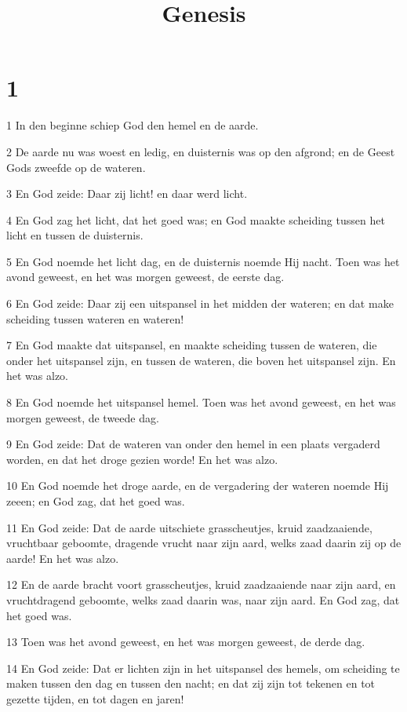 

\title{Genesis}




\chapter{1}

\par 1 In den beginne schiep God den hemel en de aarde.
\par 2 De aarde nu was woest en ledig, en duisternis was op den afgrond; en de Geest Gods zweefde op de wateren.
\par 3 En God zeide: Daar zij licht! en daar werd licht.
\par 4 En God zag het licht, dat het goed was; en God maakte scheiding tussen het licht en tussen de duisternis.
\par 5 En God noemde het licht dag, en de duisternis noemde Hij nacht. Toen was het avond geweest, en het was morgen geweest, de eerste dag.
\par 6 En God zeide: Daar zij een uitspansel in het midden der wateren; en dat make scheiding tussen wateren en wateren!
\par 7 En God maakte dat uitspansel, en maakte scheiding tussen de wateren, die onder het uitspansel zijn, en tussen de wateren, die boven het uitspansel zijn. En het was alzo.
\par 8 En God noemde het uitspansel hemel. Toen was het avond geweest, en het was morgen geweest, de tweede dag.
\par 9 En God zeide: Dat de wateren van onder den hemel in een plaats vergaderd worden, en dat het droge gezien worde! En het was alzo.
\par 10 En God noemde het droge aarde, en de vergadering der wateren noemde Hij zeeen; en God zag, dat het goed was.
\par 11 En God zeide: Dat de aarde uitschiete grasscheutjes, kruid zaadzaaiende, vruchtbaar geboomte, dragende vrucht naar zijn aard, welks zaad daarin zij op de aarde! En het was alzo.
\par 12 En de aarde bracht voort grasscheutjes, kruid zaadzaaiende naar zijn aard, en vruchtdragend geboomte, welks zaad daarin was, naar zijn aard. En God zag, dat het goed was.
\par 13 Toen was het avond geweest, en het was morgen geweest, de derde dag.
\par 14 En God zeide: Dat er lichten zijn in het uitspansel des hemels, om scheiding te maken tussen den dag en tussen den nacht; en dat zij zijn tot tekenen en tot gezette tijden, en tot dagen en jaren!
